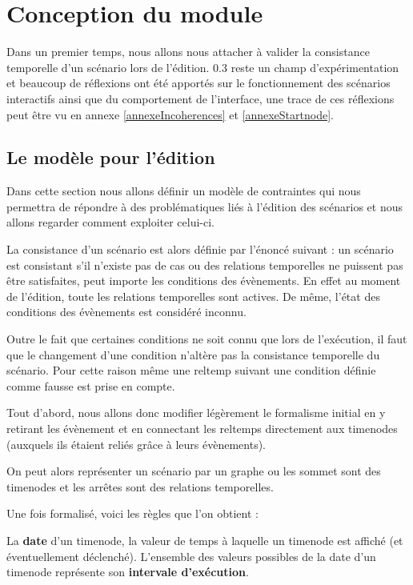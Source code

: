 \chapter{Conception du module \csp{}}
 Dans un premier temps, nous allons nous attacher à valider la consistance temporelle d'un scénario lors de l'édition.
 \iscore{} 0.3 reste un champ d'expérimentation et beaucoup de réflexions ont été apportés sur le fonctionnement des scénarios interactifs ainsi que du comportement de l'interface, une trace de ces réflexions peut être vu en annexe \ref{annexeIncoherences} et \ref{annexeStartnode}.

\section{Le modèle pour l'édition}
Dans cette section nous allons définir un modèle de contraintes qui nous permettra de répondre à des problématiques liés à l'édition des scénarios et nous allons regarder comment exploiter celui-ci.


La consistance d'un scénario est alors définie par l'énoncé suivant : un scénario est consistant s'il n'existe pas de cas ou des relations temporelles ne puissent pas être satisfaites, peut importe les conditions des évènements.
%
En effet au moment de l'édition, toute les relations temporelles sont actives. De même, l'état des conditions des évènements est considéré inconnu.
\begin{apparte}
    Outre le fait que certaines conditions ne soit connu que lors de l'exécution, il faut que le changement d'une condition n'altère pas la consistance temporelle du scénario. Pour cette raison même une \gls{reltemp} suivant une condition définie comme fausse est prise en compte.%
\end{apparte}

Tout d'abord, nous allons donc modifier légèrement le formalisme initial en y retirant les évènement et en connectant les \glspl{reltemp} directement aux timenodes (auxquels ils étaient reliés grâce à leurs évènements).

On peut alors représenter un scénario par un graphe ou les sommet sont des timenodes et les arrêtes sont des relations temporelles.


Une fois formalisé, voici les règles que l'on obtient :

La \textbf{date}  d'un \gls{timenode}, la valeur de temps à laquelle un \gls{timenode} est affiché (et éventuellement déclenché). L'ensemble des valeurs possibles de la date d'un \gls{timenode} représente son \textbf{intervale d'exécution}.

